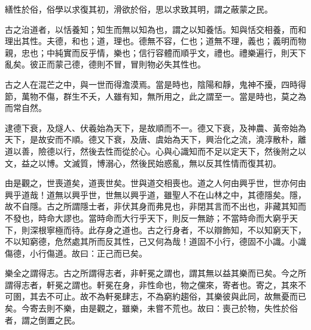 
\begin{pinyinscope}
繕性於俗，俗學以求復其初，滑欲於俗，思以求致其明，謂之蔽蒙之民。

古之治道者，以恬養知；知生而無以知為也，謂之以知養恬。知與恬交相養，而和理出其性。夫德，和也；道，理也。德無不容，仁也；道無不理，義也；義明而物親，忠也；中純實而反乎情，樂也；信行容體而順乎文，禮也。禮樂遍行，則天下亂矣。彼正而蒙己德，德則不冒，冒則物必失其性也。

古之人在混芒之中，與一世而得澹漠焉。當是時也，陰陽和靜，鬼神不擾，四時得節，萬物不傷，群生不夭，人雖有知，無所用之，此之謂至一。當是時也，莫之為而常自然。

逮德下衰，及燧人、伏羲始為天下，是故順而不一。德又下衰，及神農、黃帝始為天下，是故安而不順。德又下衰，及唐、虞始為天下，興治化之流，澆淳散朴，離道以善，險德以行，然後去性而從於心。心與心識知而不足以定天下，然後附之以文，益之以博。文滅質，博溺心，然後民始惑亂，無以反其性情而復其初。

由是觀之，世喪道矣，道喪世矣。世與道交相喪也。道之人何由興乎世，世亦何由興乎道哉！道無以興乎世，世無以興乎道，雖聖人不在山林之中，其德隱矣。隱，故不自隱。古之所謂隱士者，非伏其身而弗見也，非閉其言而不出也，非藏其知而不發也，時命大謬也。當時命而大行乎天下，則反一無跡；不當時命而大窮乎天下，則深根寧極而待。此存身之道也。古之行身者，不以辯飾知，不以知窮天下，不以知窮德，危然處其所而反其性，己又何為哉！道固不小行，德固不小識。小識傷德，小行傷道。故曰：正己而已矣。

樂全之謂得志。古之所謂得志者，非軒冕之謂也，謂其無以益其樂而已矣。今之所謂得志者，軒冕之謂也。軒冕在身，非性命也，物之儻來，寄者也。寄之，其來不可圉，其去不可止。故不為軒冕肆志，不為窮約趨俗，其樂彼與此同，故無憂而已矣。今寄去則不樂，由是觀之，雖樂，未嘗不荒也。故曰：喪己於物，失性於俗者，謂之倒置之民。


\end{pinyinscope}